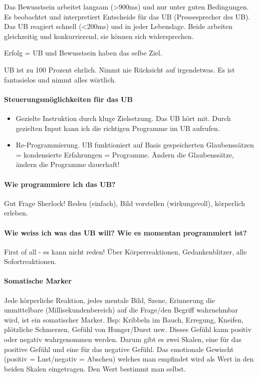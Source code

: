Das Bewusstsein arbeitet langsam (>900ms) und nur unter guten Bedingungen. Es beobachtet und interpretiert Entscheide für das UB (Pressesprecher des UB). Das UB reagiert schnell (<200ms) und in jeder Lebenslage. Beide arbeiten gleichzeitig und konkurrierend, sie können sich widersprechen. 

Erfolg = UB und Bewusstsein haben das selbe Ziel.

UB ist zu 100 Prozent ehrlich. Nimmt nie Rücksicht auf irgendetwas. Es ist fantasielos und nimmt alles wörtlich.

\paragraph{Steuerungsmöglichkeiten für das UB}
\begin{itemize}
	\item Gezielte Instruktion durch kluge Zielsetzung. Das UB hört mit. Durch gezielten Input kann ich die richtigen Programme im UB aufrufen.
	\item Re-Programmierung. UB funktioniert auf Basis gespeicherten Glaubenssätzen = kondensierte Erfahrungen = Programme. Ändern die Glaubenssätze, ändern die Programme dauerhaft! 
\end{itemize}

\paragraph{Wie programmiere ich das UB?}
Gut Frage Sherlock! Reden (einfach), Bild vorstellen (wirkungsvoll), körperlich erleben.

\paragraph{Wie weiss ich was das UB will? Wie es momentan programmiert ist?}
First of all - es kann nicht reden! Über Körperreaktionen, Gedankenblitzer, alle Sofortreaktionen.

\paragraph{Somatische Marker}
Jede körperliche Reaktion, jedes mentale Bild, Szene, Erinnerung die unmittelbare (Millisekundenbereich) auf die Frage/den Begriff wahrnehmbar wird, ist ein somatischer Marker. Bsp: Kribbeln im Bauch, Erregung, Kneifen, plötzliche Schmerzen, Gefühl von Hunger/Durst usw. Dieses Gefühl kann positiv oder negativ wahrgenommen werden. Darum gibt es zwei Skalen, eine für das positive Gefühl und eine für das negative Gefühl. Das emotionale Gewischt (positiv = Lust/negativ = Abscheu) welches man empfindet wird als Wert in den beiden Skalen eingetragen. Den Wert bestimmt man selbst.

